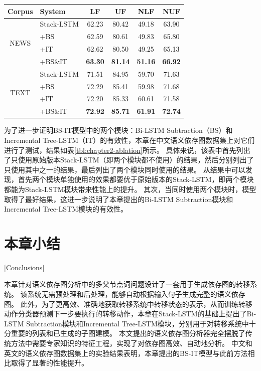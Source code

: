 \begin{table}[htpb]
    \vspace{0.5em}\centering\wuhao
	\begin{tabular}{clcccc}
		\toprule[1.5pt]
		Corpus& System & LF & UF & NLF & NUF\\
		\midrule[1pt]
		\multirow{4}{*}{NEWS}
		&Stack-LSTM&62.23&80.42&49.18&63.90\\
		&+BS &62.59&80.61&49.83&65.80\\
		&+IT &62.62&80.50&49.25&65.13\\
		&+BS\&IT &\bf63.30&\bf81.14&\bf51.16&\bf66.92\\
		\hline
		\multirow{4}{*}{TEXT}
		&Stack-LSTM&71.51&84.95&59.70&71.63\\
		&+BS &72.29&85.41&59.98&71.68\\
		&+IT &72.20&85.33&60.61&71.58\\
		&+BS\&IT &\bf72.92&\bf85.71&\bf61.91&\bf72.74\\
		\bottomrule[1.5pt]
	\end{tabular}
\end{table}

为了进一步证明BS-IT模型中的两个模块：Bi-LSTM Subtraction（BS）和Incremental Tree-LSTM（IT）的有效性，本章在中文语义依存图数据集上对它们进行了测试，结果如表\ref{tbl:chapter2-ablation}所示。
具体来说，该表中首先列出了只使用原始版本Stack-LSTM（即两个模块都不使用）的结果，然后分别列出了只使用其中之一的结果，最后列出了两个模块同时使用的结果。
从结果中可以发现，首先两个模块单独使用的效果都要优于原始版本的Stack-LSTM，即两个模块都能为Stack-LSTM模块带来性能上的提升。
其次，当同时使用两个模块时，模型取得了最好结果，这进一步说明了本章提出的Bi-LSTM Subtraction模块和Incremental Tree-LSTM模块的有效性。

\section{本章小结}[Conclusions]

本章针对语义依存图分析中的多父节点词问题设计了一套用于生成依存图的转移系统。
该系统无需预处理和后处理，能够自动根据输入句子生成完整的语义依存图。
此外，为了更高效、准确地获取转移系统中转移状态的表示，从而训练转移动作分类器预测下一步要执行的转移动作，本章在Stack-LSTM的基础上提出了Bi-LSTM Subtraction模块和Incremental Tree-LSTM模块，分别用于对转移系统中十分重要的列表和已生成的子图建模。
本文提出的语义依存图分析器完全摆脱了传统方法中需要专家知识的特征工程，实现了对依存图高效、自动地分析。
中文和英文的语义依存图数据集上的实验结果表明，本章提出的BS-IT模型与此前方法相比取得了显著的性能提升。

